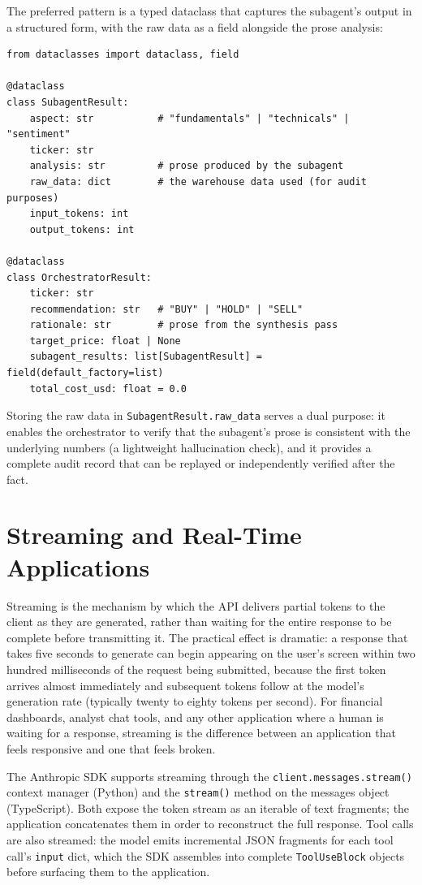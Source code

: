 The preferred pattern is a typed dataclass that captures the subagent's output in a
structured form, with the raw data as a field alongside the prose analysis:

\begin{verbatim}
from dataclasses import dataclass, field

@dataclass
class SubagentResult:
    aspect: str           # "fundamentals" | "technicals" | "sentiment"
    ticker: str
    analysis: str         # prose produced by the subagent
    raw_data: dict        # the warehouse data used (for audit purposes)
    input_tokens: int
    output_tokens: int

@dataclass
class OrchestratorResult:
    ticker: str
    recommendation: str   # "BUY" | "HOLD" | "SELL"
    rationale: str        # prose from the synthesis pass
    target_price: float | None
    subagent_results: list[SubagentResult] = field(default_factory=list)
    total_cost_usd: float = 0.0
\end{verbatim}

Storing the raw data in \texttt{SubagentResult.raw\_data} serves a dual purpose: it
enables the orchestrator to verify that the subagent's prose is consistent with the
underlying numbers (a lightweight hallucination check), and it provides a complete
audit record that can be replayed or independently verified after the fact.

\section{Streaming and Real-Time Applications}
\label{app:sdk-commercial:streaming}

Streaming is the mechanism by which the API delivers partial tokens to the client as
they are generated, rather than waiting for the entire response to be complete before
transmitting it. The practical effect is dramatic: a response that takes five seconds
to generate can begin appearing on the user's screen within two hundred milliseconds
of the request being submitted, because the first token arrives almost immediately and
subsequent tokens follow at the model's generation rate (typically twenty to eighty
tokens per second). For financial dashboards, analyst chat tools, and any other
application where a human is waiting for a response, streaming is the difference
between an application that feels responsive and one that feels broken.

The Anthropic SDK supports streaming through the \texttt{client.messages.stream()}
context manager (Python) and the \texttt{stream()} method on the messages object
(TypeScript). Both expose the token stream as an iterable of text fragments; the
application concatenates them in order to reconstruct the full response. Tool calls
are also streamed: the model emits incremental JSON fragments for each tool call's
\texttt{input} dict, which the SDK assembles into complete \texttt{ToolUseBlock}
objects before surfacing them to the application.

